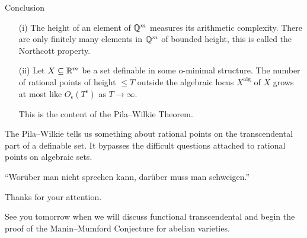 \documentclass{beamer}
\begin{document}
\begin{frame}{Conclusion}
  \begin{enumerate}
  \item [(i)]  The height of an element of ${\mathbb{Q}}^m$ measures its arithmetic
    complexity.
    There are only finitely many elements in ${\mathbb{Q}}^m$ of bounded
    height, this is called the Northcott property.
    
  \item[(ii)] Let $X\subseteq{\mathbb{R}}^m$ be a set definable in some o-minimal
    structure.
    The number of rational points of height $\le T$  outside the
    \alert{algebraic locus} $X^{\mathrm{alg}}$ of $X$ grows at most
    like $O_\epsilon(T^{\epsilon})$ as $T\rightarrow\infty$.
    
    This is the content of the Pila--Wilkie Theorem.
  \end{enumerate}

  
  The Pila--Wilkie tells us something about rational points on the
  \alert{transcendental} part of a definable set.
  It bypasses the difficult questions attached to
  rational points on \alert{algebraic} sets.

  \bigskip
  \begin{displayquote}
    ``Worüber man nicht sprechen kann, darüber muss man schweigen.''
  \end{displayquote}
\end{frame}


\begin{frame}
  \begin{center}
    Thanks for your attention.

    See you tomorrow when we will discuss functional transcendental
    and begin the proof of the Manin--Mumford Conjecture for
    abelian varieties. 
  \end{center}
\end{frame}
\end{document}
